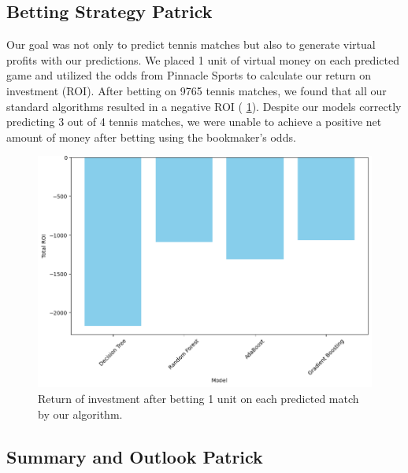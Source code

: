 \subsection{Betting Strategy Patrick}
Our goal was not only to predict tennis matches but also to generate virtual profits with our predictions. We placed 1 unit of virtual money on each predicted game and utilized the odds from Pinnacle Sports to calculate our return on investment (ROI). After betting on 9765 tennis matches, we found that all our standard algorithms resulted in a negative ROI ( \ref{betting_strategy}). Despite our models correctly predicting 3 out of 4 tennis matches, we were unable to achieve a positive net amount of money after betting using the bookmaker's odds.
%
\begin{figure}[h]
\includegraphics[width=\textwidth]{pictures/betting.png}
\caption{Return of investment after betting 1 unit on each predicted match by our algorithm.}
\label{betting_strategy}
\end{figure}
%

%
\subsection{Summary and Outlook Patrick}

